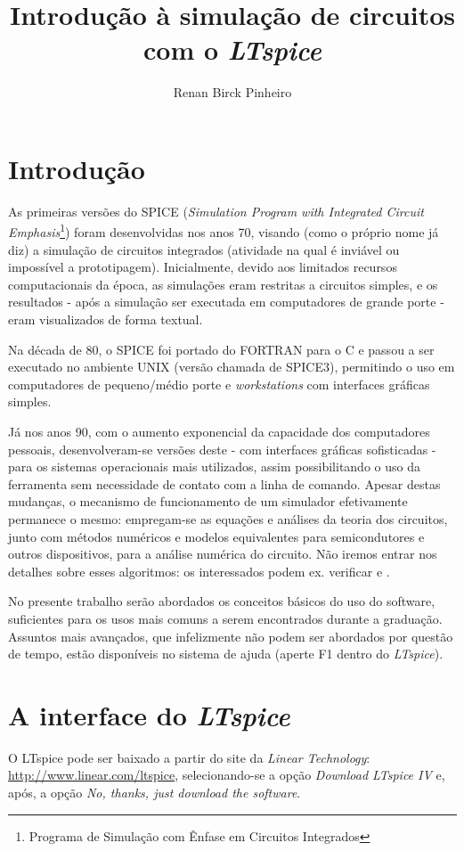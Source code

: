 \documentclass[]{book}
\title{\textbf{Introdução à simulação de circuitos com o \textit{LTspice}}}
\author{Renan Birck Pinheiro}
\begin{document}


\tableofcontents

\chapter{Introdução}
As primeiras versões do SPICE (\textit{Simulation Program with Integrated Circuit Emphasis}\footnote{Programa de Simulação com Ênfase em Circuitos Integrados}) foram desenvolvidas nos anos 70, visando (como o próprio nome já diz) a simulação de circuitos integrados (atividade na qual é inviável ou impossível a prototipagem). Inicialmente, devido aos limitados recursos computacionais da época, as simulações eram restritas a circuitos simples, e os resultados - após a simulação ser executada em computadores de grande porte - eram visualizados de forma textual.

Na década de 80, o SPICE foi portado do FORTRAN para o C e passou a ser executado no ambiente UNIX (versão chamada de SPICE3), permitindo o uso em computadores de pequeno/médio porte e \textit{workstations} com interfaces gráficas simples. 

Já nos anos 90, com o aumento exponencial da capacidade dos computadores pessoais, desenvolveram-se versões deste - com interfaces gráficas sofisticadas - para os sistemas operacionais mais utilizados, assim possibilitando o uso da ferramenta sem necessidade de contato com a linha de comando. Apesar destas mudanças, o mecanismo de funcionamento de um simulador  efetivamente permanece o mesmo: empregam-se as equações e análises da teoria dos circuitos, junto com métodos numéricos e modelos equivalentes para semicondutores e outros dispositivos, para a análise numérica do circuito. Não iremos entrar nos detalhes sobre esses algoritmos: os interessados podem ex. verificar \cite{nagel} e \cite{chung}.

No presente trabalho serão abordados os conceitos básicos do uso do software, suficientes para os usos mais comuns a serem encontrados durante a graduação. Assuntos mais avançados, que infelizmente não podem ser abordados por questão de tempo, estão disponíveis no sistema de ajuda (aperte F1 dentro do \textit{LTspice}).
\chapter{A interface do \textit{LTspice}}
O LTspice pode ser baixado a partir do site da \textit{Linear Technology}: \url{http://www.linear.com/ltspice}, selecionando-se a opção \textit{Download LTspice IV} e, após, a opção \textit{No, thanks, just download the software}. 
\end{document}
